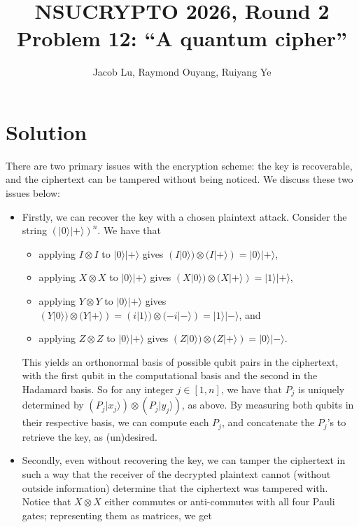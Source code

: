 \documentclass{article}
\title{NSUCRYPTO 2026, Round 2\\Problem 12: ``A quantum cipher''}
\date{}
\author{Jacob Lu, Raymond Ouyang, Ruiyang Ye}
\begin{document}
\maketitle
\section*{Solution}
There are two primary issues with the encryption scheme: the key is recoverable, and the ciphertext can be tampered without being noticed. We discuss these two issues below:
\begin{itemize}
      \item Firstly, we can recover the key with a chosen plaintext attack. Consider the string $(|0\rangle|+\rangle)^n$. We have that
            \begin{itemize}
                  \item applying $I \otimes I$ to $|0\rangle|+\rangle$ gives
                        $(I|0\rangle)\otimes(I|+\rangle)=|0\rangle|+\rangle$,
                  \item applying $X \otimes X$ to $|0\rangle|+\rangle$ gives
                        $(X|0\rangle)\otimes(X|+\rangle)=|1\rangle|+\rangle$,
                  \item applying $Y \otimes Y$ to $|0\rangle|+\rangle$ gives
                        $(Y|0\rangle)\otimes(Y|+\rangle)=(i|1\rangle)\otimes(-i|-\rangle)=|1\rangle|-\rangle$, and
                  \item applying $Z \otimes Z$ to $|0\rangle|+\rangle$ gives
                        $(Z|0\rangle)\otimes(Z|+\rangle)=|0\rangle|-\rangle$.
            \end{itemize}
            This yields an orthonormal basis of possible qubit pairs in the ciphertext, with the first qubit in the computational basis and the second in the Hadamard basis. So for any integer $j \in [1, n]$, we have that $P_j$ is uniquely determined by $(P_j|x_j\rangle) \otimes (P_j|y_j\rangle)$, as above. By measuring both qubits in their respective basis, we can compute each $P_j$, and concatenate the $P_j$'s to retrieve the key, as (un)desired.
      \item Secondly, even without recovering the key, we can tamper the ciphertext in such a way that the receiver of the decrypted plaintext cannot (without outside information) determine that the ciphertext was tampered with. Notice that $X \otimes X$ either commutes or anti-commutes with all four Pauli gates; representing them as matrices, we get
            \begin{itemize}

\end{itemize}
\end{itemize}
\end{document}
